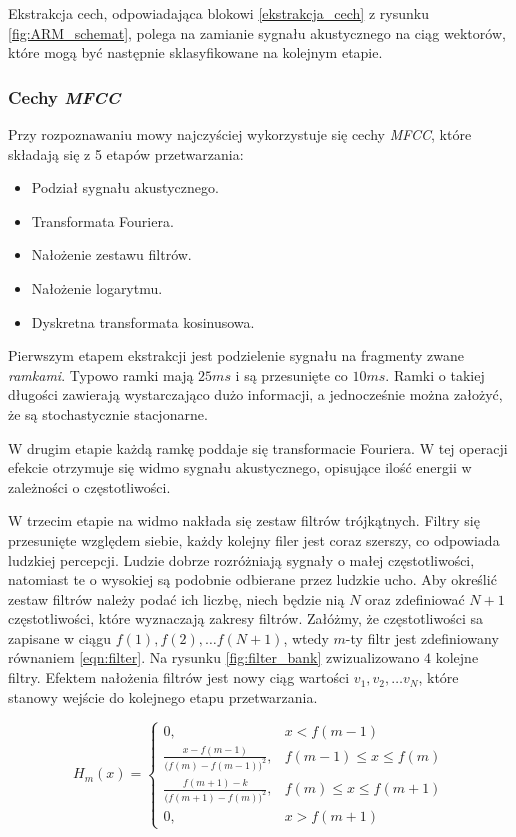 \documentclass[11pt]{article}
\newcommand{\refBlock}[1]{%
	\hyperref[#1]{\ref*{#1}}%
}
\begin{document}
	 Ekstrakcja cech, odpowiadająca blokowi \refBlock{ekstrakcja_cech} z rysunku \ref{fig:ARM_schemat}, polega na zamianie sygnału akustycznego na ciąg wektorów, które mogą być następnie sklasyfikowane na kolejnym etapie. 
	 \subsubsection{Cechy \textit{MFCC}}
	 \label{sec:Feature_vec_mfcc}
	 Przy rozpoznawaniu mowy najczyściej wykorzystuje się cechy \textit{MFCC}, które składają się z 5 etapów przetwarzania:
	 
	 \begin{itemize}
	 	\item Podział sygnału akustycznego.
	 	\item Transformata Fouriera.
	 	\item Nałożenie zestawu filtrów.
	 	\item Nałożenie logarytmu. 
	 	\item Dyskretna transformata kosinusowa.
	 \end{itemize}
 
	 Pierwszym etapem ekstrakcji jest podzielenie sygnału na fragmenty zwane \textit{ramkami}. Typowo ramki mają $25ms$ i są przesunięte co $10ms$. Ramki o takiej długości zawierają wystarczająco dużo informacji, a jednocześnie można założyć, że są stochastycznie stacjonarne. 
	 
	 W drugim etapie każdą ramkę poddaje się transformacie Fouriera. W tej operacji efekcie otrzymuje się widmo sygnału akustycznego, opisujące ilość energii w zależności o częstotliwości.
	 
	 W trzecim etapie na widmo nakłada się zestaw filtrów trójkątnych. Filtry się przesunięte względem siebie, każdy kolejny filer jest coraz szerszy, co odpowiada ludzkiej percepcji. Ludzie dobrze rozróżniają sygnały o małej częstotliwości, natomiast te o wysokiej są podobnie odbierane przez ludzkie ucho. Aby określić zestaw filtrów należy podać ich liczbę, niech będzie nią $N$ oraz zdefiniować $N+1$ częstotliwości, które wyznaczają zakresy filtrów. Załóżmy, że częstotliwości sa zapisane w ciągu $f(1), f(2), \ldots f(N+1)$, wtedy $m$-ty filtr jest zdefiniowany równaniem \ref{eqn:filter}. Na rysunku \ref{fig:filter_bank} zwizualizowano $4$ kolejne filtry. Efektem nałożenia filtrów jest nowy ciąg wartości $v_1, v_2, \ldots v_N$, które stanowy wejście do kolejnego etapu przetwarzania.
	 
	 \begin{equation}
		 H_m(x)= 
			 \begin{cases}
				 0,				 					 & x < f(m-1) 		       \\
				 \frac{x - f(m-1)}{\big(f(m) - f(m-1)\big)^2}, & f(m-1) \leq x \leq f(m) \\
				 \frac{f(m+1) - k}{\big(f(m+1) - f(m)\big)^2}, & f(m) \leq x \leq f(m+1) \\
				 0,				 					 & x > f(m+1)
			 \end{cases}
		 \label{eqn:filter}
	 \end{equation}
	 
\end{document}
